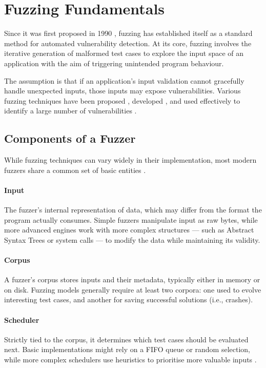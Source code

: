 \section{Fuzzing Fundamentals}
\label{sec:ff}

Since it was first proposed in 1990 \cite{miller1990empirical}, fuzzing has established itself as a standard method for automated vulnerability detection. At its core, fuzzing involves the iterative generation of malformed test cases to explore the input space of an application with the aim of triggering unintended program behaviour. 

The assumption is that if an application's input validation cannot gracefully handle unexpected inputs, those inputs may expose vulnerabilities. Various fuzzing techniques have been proposed \cite{aschermann2019nautilus, chen2018angora, dutra2023formatfuzzer}, developed \cite{honggfuzz, libfuzzer, zalewski2014afltech}, and used effectively to identify a large number of vulnerabilities \cite{honggfuzzbugs, syzkallerbugs, rashbugs}.

\subsection{Components of a Fuzzer}

While fuzzing techniques can vary widely in their implementation, most modern fuzzers share a common set of basic entities \cite{fioraldi2022libafl}.

\paragraph{Input} The fuzzer's internal representation of data, which may differ from the format the program actually consumes. Simple fuzzers manipulate input as raw bytes, while more advanced engines work with more complex structures --- such as Abstract Syntax Trees \cite{aschermann2019nautilus} or system calls \cite{syzkaller} --- to modify the data while maintaining its validity. 

\paragraph{Corpus} A fuzzer's corpus stores inputs and their metadata, typically either in memory or on disk. Fuzzing models generally require at least two corpora: one used to evolve interesting test cases, and another for saving successful solutions (i.e., crashes).

\paragraph{Scheduler} Strictly tied to the corpus, it determines which test cases should be evaluated next. Basic implementations might rely on a FIFO queue or random selection, while more complex schedulers use heuristics to prioritise more valuable inputs \cite{chen2020meuzz, rebert2014optimizing, wang2021reinforcement}.


